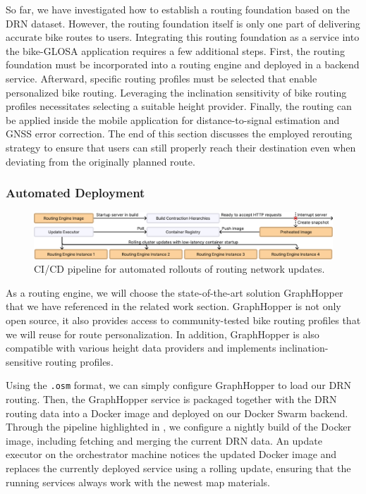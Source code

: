 So far, we have investigated how to establish a routing foundation based on the DRN dataset. However, the routing foundation itself is only one part of delivering accurate bike routes to users. Integrating this routing foundation as a service into the bike-GLOSA application requires a few additional steps. First, the routing foundation must be incorporated into a routing engine and deployed in a backend service. Afterward, specific routing profiles must be selected that enable personalized bike routing. Leveraging the inclination sensitivity of bike routing profiles necessitates selecting a suitable height provider. Finally, the routing can be applied inside the mobile application for distance-to-signal estimation and GNSS error correction. The end of this section discusses the employed rerouting strategy to ensure that users can still properly reach their destination even when deviating from the originally planned route.

\subsubsection{Automated Deployment}

\begin{figure}[ht]
\centering
\includegraphics[width=\linewidth]{images/load-distribution-containerization-preheating.pdf}
\caption{CI/CD pipeline for automated rollouts of routing network updates.}
\label{fig:multi-stage-continuous-deployment}
\end{figure}

As a routing engine, we will choose the state-of-the-art solution GraphHopper that we have referenced in the related work section. GraphHopper is not only open source, it also provides access to community-tested bike routing profiles that we will reuse for route personalization. In addition, GraphHopper is also compatible with various height data providers and implements inclination-sensitive routing profiles. 

Using the \texttt{.osm} format, we can simply configure GraphHopper to load our DRN routing. Then, the GraphHopper service is packaged together with the DRN routing data into a Docker image and deployed on our Docker Swarm backend. Through the pipeline highlighted in , we configure a nightly build of the Docker image, including fetching and merging the current DRN data. An update executor on the orchestrator machine notices the updated Docker image and replaces the currently deployed service using a rolling update, ensuring that the running services always work with the newest map materials. 

